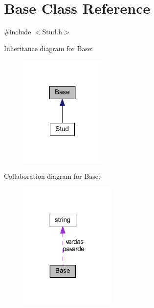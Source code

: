 \hypertarget{class_base}{}\section{Base Class Reference}
\label{class_base}


{\ttfamily \#include $<$Stud.\+h$>$}



Inheritance diagram for Base\+:
\nopagebreak
\begin{figure}[H]
\begin{center}
\leavevmode
\includegraphics[width=119pt]{class_base__inherit__graph}
\end{center}
\end{figure}


Collaboration diagram for Base\+:
\nopagebreak
\begin{figure}[H]
\begin{center}
\leavevmode
\includegraphics[width=135pt]{class_base__coll__graph}
\end{center}
\end{figure}
